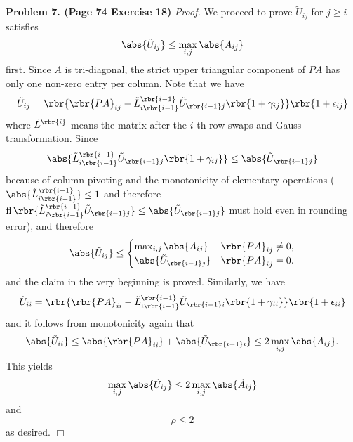 \documentclass[english, nochinese]{pnote}
\DeclareMathOperator\opfl{\mathrm{fl}}
\begin{document}
\textbf{Problem 7. (Page 74 Exercise 18)} \textit{Proof.} We proceed to prove $ \tilde{U}_{ i j } $ for $ j \ge i $ satisfies
\begin{equation}
\abs{\tilde{U}_{ i j }} \le \max_{ i, j } \abs{A_{ i j }}
\end{equation}
first. Since $A$ is tri-diagonal, the strict upper triangular component of $ P A $ has only one non-zero entry per column. Note that we have
\begin{equation}
\tilde{U}_{ i j } = \rbr{ \rbr{ P A }_{ i j } - \tilde{L}^{\rbr{ i - 1 }}_{ i \rbr{ i - 1 } } \tilde{U}_{ \rbr{ i - 1 } j } \rbr{ 1 + \gamma_{ i j } } } \rbr{ 1 + \epsilon_{ i j } }
\end{equation}
where $\tilde{L}^{\rbr{i}}$ means the matrix after the $i$-th row swaps and Gauss transformation. Since
\begin{equation}
\abs{ \tilde{L}^{\rbr{ i - 1 }}_{ i \rbr{ i - 1 } } \tilde{U}_{ \rbr{ i - 1 } j } \rbr{ 1 + \gamma_{ i j } } } \le \abs{\tilde{U}_{ \rbr{ i - 1 } j }}
\end{equation}
because of column pivoting and the monotonicity of elementary operations ( $ \abs{ \tilde{L}_{ i \rbr{ i - 1 } }^{\rbr{ i - 1 }} } \le 1 $ and therefore $ \opfl \rbr{ \tilde{L}_{ i \rbr{ i - 1 } }^{\rbr{ i - 1 }} \tilde{U}_{ \rbr{ i - 1 } j } } \le \abs{\tilde{U}_{ \rbr{ i - 1 } j }} $ must hold even in rounding error), and therefore
\begin{equation}
\abs{\tilde{U}_{ i j }} \le
\begin{cases}
\max_{ i, j } \abs{A_{ i j }} & \rbr{ P A }_{ i j } \neq 0, \\
\abs{\tilde{U}_{ \rbr{ i - 1 } j }} & \rbr{ P A }_{ i j } = 0.
\end{cases}
\end{equation}
and the claim in the very beginning is proved. Similarly, we have
\begin{equation}
\tilde{U}_{ i i } = \rbr{ \rbr{ P A }_{ i i } - \tilde{L}_{ i \rbr{ i - 1 } }^{\rbr{ i - 1 }} \tilde{U}_{ \rbr{ i - 1 } i } \rbr{ 1 + \gamma_{ i i }} } \rbr{ 1 + \epsilon_{ i i } }
\end{equation}
and it follows from monotonicity again that
\begin{equation}
\abs{\tilde{U}_{ i i }} \le \abs{\rbr{ P A }_{ i i }} + \abs{\tilde{U}_{ \rbr{ i - 1 } i }} \le 2 \max_{ i, j } \abs{A_{ i j }}.
\end{equation}
This yields
\begin{equation}
\max_{ i, j } \abs{\tilde{U}_{ i j }} \le 2 \max_{ i, j } \abs{\tilde{A}_{ i j }}
\end{equation}
and
\begin{equation}
\rho \le 2
\end{equation}
as desired.
\hfill$\Box$
\end{document}
